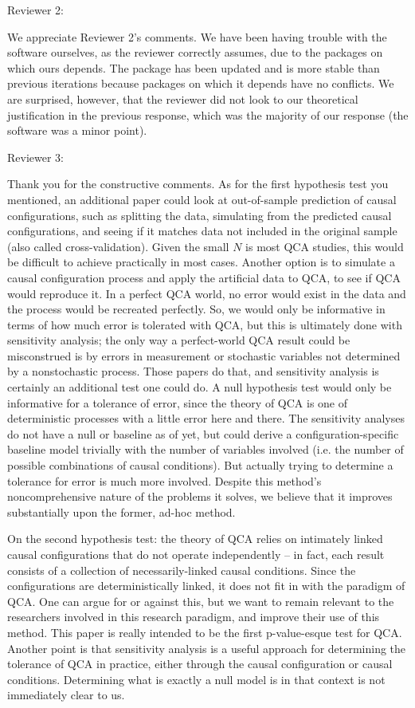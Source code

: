 \documentclass[12pt,stdletter,dateno,sigleft]{newlfm} %
\begin{document}
\begin{newlfm}
Reviewer 2: 

We appreciate Reviewer 2's comments. We have been having trouble with the software ourselves, as the reviewer correctly assumes, due to the packages on which ours depends. The package has been updated and is more stable than previous iterations because packages on which it depends have no conflicts. We are surprised, however, that the reviewer did not look to our theoretical justification in the previous response, which was the majority of our response (the software was a minor point). \newline


Reviewer 3: 

Thank you for the constructive comments. As for the first hypothesis test you mentioned, an additional paper could look at out-of-sample prediction of causal configurations, such as splitting the data, simulating from the predicted causal configurations, and seeing if it matches data not included in the original sample (also called cross-validation). Given the small $N$ is most QCA studies, this would be difficult to achieve practically in most cases. Another option is to simulate a causal configuration process and apply the artificial data to QCA, to see if QCA would reproduce it. In a perfect QCA world, no error would exist in the data and the process would be recreated perfectly. So, we would only be informative in terms of how much error is tolerated with QCA, but this is ultimately done with sensitivity analysis; the only way a perfect-world QCA result could be misconstrued is by errors in measurement or stochastic variables not determined by a nonstochastic process. Those papers do that, and sensitivity analysis is certainly an additional test one could do. A null hypothesis test would only be informative for a tolerance of error, since the theory of QCA is one of deterministic processes with a little error here and there. The sensitivity analyses do not have a null or baseline as of yet, but could derive a configuration-specific baseline model trivially with the number of variables involved (i.e. the number of possible combinations of causal conditions). But actually trying to determine a tolerance for error is much more involved. Despite this method's noncomprehensive nature of the problems it solves, we believe that it improves substantially upon the former, ad-hoc method.

On the second hypothesis test: the theory of QCA relies on intimately linked causal configurations that do not operate independently -- in fact, each result consists of a collection of necessarily-linked causal conditions. Since the configurations are deterministically linked, it does not fit in with the paradigm of QCA. One can argue for or against this, but we want to remain relevant to the researchers involved in this research paradigm, and improve their use of this method. This paper is really intended to be the first p-value-esque test for QCA. Another point is that sensitivity analysis is a useful approach for determining the tolerance of QCA in practice, either through the causal configuration or causal conditions. Determining what is exactly a null model is in that context is not immediately clear to us. 


\end{newlfm}
\end{document}
